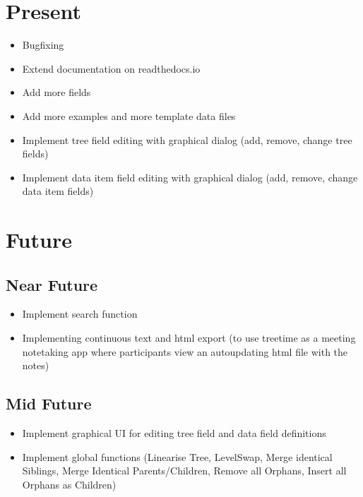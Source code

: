 \documentclass[letterpaper,10pt,english]{sphinxmanual}
\begin{document}
\section{Present}
\label{\detokenize{releases:present}}\begin{itemize}
\item {} 
\sphinxAtStartPar
Bugfixing

\item {} 
\sphinxAtStartPar
Extend documentation on readthedocs.io

\item {} 
\sphinxAtStartPar
Add more fields

\item {} 
\sphinxAtStartPar
Add more examples and more template data files

\item {} 
\sphinxAtStartPar
Implement tree field editing with graphical dialog (add, remove, change tree fields)

\item {} 
\sphinxAtStartPar
Implement data item field editing with graphical dialog (add, remove, change data item fields)

\end{itemize}


\section{Future}
\label{\detokenize{releases:future}}

\subsection{Near Future}
\label{\detokenize{releases:near-future}}\begin{itemize}
\item {} 
\sphinxAtStartPar
Implement search function

\item {} 
\sphinxAtStartPar
Implementing continuous text and html export (to use treetime as a meeting note\sphinxhyphen{}taking app where participants view an auto\sphinxhyphen{}updating html file with the notes)

\end{itemize}


\subsection{Mid Future}
\label{\detokenize{releases:mid-future}}\begin{itemize}
\item {} 
\sphinxAtStartPar
Implement graphical UI for editing tree field and data field definitions

\item {} 
\sphinxAtStartPar
Implement global functions (Linearise Tree, Level\sphinxhyphen{}Swap, Merge identical Siblings, Merge Identical Parents/Children, Remove all Orphans, Insert all Orphans as Children)

\end{itemize}
\end{document}

